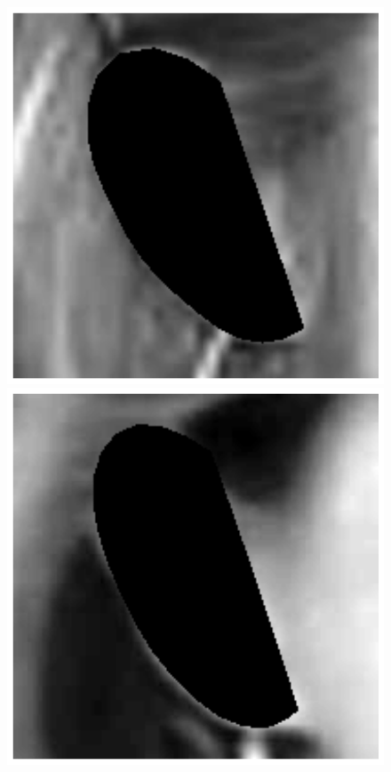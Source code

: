 \begin{figure}[!t]
    \\
    \includegraphics[height=\flowh]{resources/Ear_Deformable_Model/verification/background_exp/ear_bg_3}
    \includegraphics[height=\flowh]{resources/Ear_Deformable_Model/verification/background_exp/ear_bg_4}

\end{figure}
